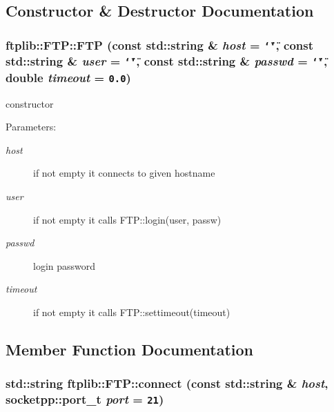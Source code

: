 \subsection{Constructor \& Destructor Documentation}
\hypertarget{classftplib_1_1FTP_178979abdc58593abdb31a882f370803}{
\subsubsection[{FTP}]{\setlength{\rightskip}{0pt plus 5cm}ftplib::FTP::FTP (const std::string \& {\em host} = {\tt \char`\"{}\char`\"{}}, \/  const std::string \& {\em user} = {\tt \char`\"{}\char`\"{}}, \/  const std::string \& {\em passwd} = {\tt \char`\"{}\char`\"{}}, \/  double {\em timeout} = {\tt 0.0})}}
\label{classftplib_1_1FTP_178979abdc58593abdb31a882f370803}


constructor 

\begin{Desc}
\item[Parameters:]
\begin{description}
\item[{\em host}]if not empty it connects to given hostname \item[{\em user}]if not empty it calls FTP::login(user, passw) \item[{\em passwd}]login password \item[{\em timeout}]if not empty it calls FTP::settimeout(timeout) \end{description}
\end{Desc}


\subsection{Member Function Documentation}
\hypertarget{classftplib_1_1FTP_fbd3444a33e5dd055474c9a0d6aabba5}{
\subsubsection[{connect}]{\setlength{\rightskip}{0pt plus 5cm}std::string ftplib::FTP::connect (const std::string \& {\em host}, \/  socketpp::port\_\-t {\em port} = {\tt 21})}}
\label{classftplib_1_1FTP_fbd3444a33e5dd055474c9a0d6aabba5}


